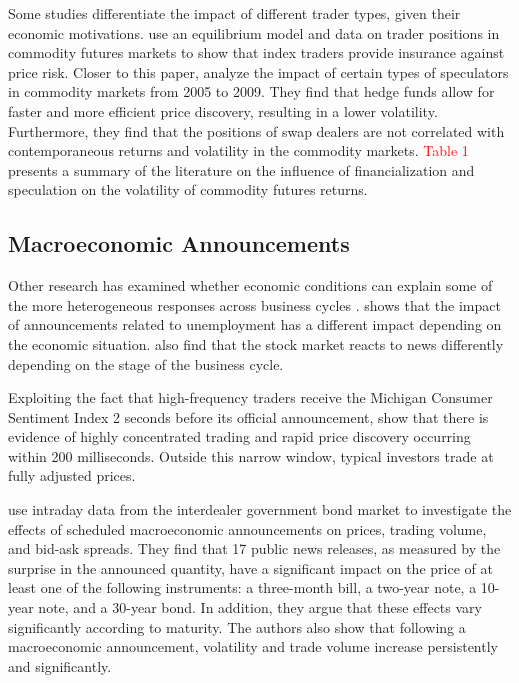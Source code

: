 \documentclass[12pt]{article}
\begin{document}
 Some studies differentiate the impact of different trader types, given their economic motivations. \citet{brunetti2014commodity}  use an equilibrium model and data on trader positions in commodity futures markets to show that index traders provide insurance against price risk.   Closer to this paper, \citet{brunetti2016speculators}  analyze the impact of certain types of speculators in commodity markets from 2005 to 2009. They find that hedge funds allow for faster and more efficient price discovery, resulting in a lower volatility. Furthermore, they find that the positions of swap dealers are not correlated with contemporaneous returns and volatility in the commodity markets.  \textcolor{red}{Table 1} presents a summary of the literature on the influence of financialization and speculation on the volatility of commodity futures returns.

\subsection{Macroeconomic Announcements}

Other research has examined whether economic conditions can explain some of the more heterogeneous responses across business cycles \citep{boyd2005stock,andersen2003micro}. \citet{boyd2005stock} shows that the impact of announcements related to unemployment has a different impact depending on the economic situation. \citet{andersen2003micro} also find that the stock market reacts to news differently depending on the stage of the business cycle.

Exploiting the fact that high-frequency traders receive the Michigan Consumer Sentiment Index 2 seconds before its official announcement, \citet{hu2017early} show that there is evidence of highly concentrated trading and rapid price discovery occurring within 200 milliseconds. Outside this narrow window, typical investors trade at fully adjusted prices. 

\citet{balduzzi2001economic}  use intraday data from the interdealer government bond market to investigate the effects of scheduled macroeconomic announcements on prices, trading volume, and bid-ask spreads. They find that 17 public news releases, as measured by the surprise in the announced quantity, have a significant impact on the price of at least one of the following instruments: a three-month bill, a two-year note, a 10-year note, and a 30-year bond. In addition, they argue that these effects vary significantly according to maturity. The authors also show that following a macroeconomic announcement, volatility and trade volume increase persistently and significantly.
\end{document}
